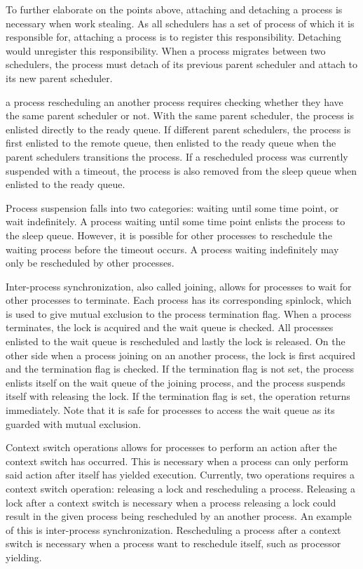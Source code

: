 To further elaborate on the points above, attaching and detaching a process is necessary when work stealing. As all schedulers has a set of process of which it is responsible for, attaching a process is to register this responsibility. Detaching would unregister this responsibility. When a process migrates between two schedulers, the process must detach of its previous parent scheduler and attach to its new parent scheduler. 

a process rescheduling an another process requires checking whether they have the same parent scheduler or not. With the same parent scheduler, the process is enlisted directly to the ready queue. If different parent schedulers, the process is first enlisted to the remote queue, then enlisted to the ready queue when the parent schedulers transitions the process. If a rescheduled process was currently suspended with a timeout, the process is also removed from the sleep queue when enlisted to the ready queue.

Process suspension falls into two categories: waiting until some time point, or wait indefinitely. A process waiting until some time point enlists the process to the sleep queue. However, it is possible for other processes to reschedule the waiting process before the timeout occurs. A process waiting indefinitely may only be rescheduled by other processes.

Inter\hyp{}process synchronization, also called joining, allows for processes to wait for other processes to terminate. Each process has its corresponding spinlock, which is used to give mutual exclusion to the process termination flag. When a process terminates, the lock is acquired and the wait queue is checked. All processes enlisted to the wait queue is rescheduled and lastly the lock is released. On the other side when a process joining on an another process, the lock is first acquired and the termination flag is checked. If the termination flag is not set, the process enlists itself on the wait queue of the joining process, and the process suspends itself with releasing the lock. If the termination flag is set, the operation returns immediately. Note that it is safe for processes to access the wait queue as its guarded with mutual exclusion.

Context switch operations allows for processes to perform an action after the context switch has occurred. This is necessary when a process can only perform said action after itself has yielded execution. Currently, two operations requires a context switch operation: releasing a lock and rescheduling a process. Releasing a lock after a context switch is necessary when a process releasing a lock could result in the given process being rescheduled by an another process. An example of this is inter\hyp{}process synchronization. Rescheduling a process after a context switch is necessary when a process want to reschedule itself, such as processor yielding.


